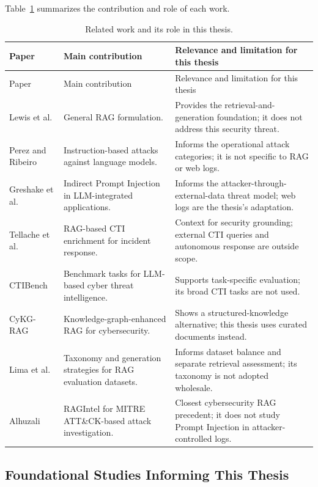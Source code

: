 Table~\ref{tab:related-work-papers} summarizes the contribution and role of
each work.

{\footnotesize
\setlength{\tabcolsep}{3pt}
\begin{longtable}{@{}>{\raggedright\arraybackslash}p{}>{\raggedright\arraybackslash}p{}>{\raggedright\arraybackslash}p{}@{}}
\caption{Related work and its role in this thesis.}
\label{tab:related-work-papers}\\
\toprule
Paper & Main contribution & Relevance and limitation for this thesis \\
\midrule
\endfirsthead
\toprule
Paper & Main contribution & Relevance and limitation for this thesis \\
\midrule
\endhead
\bottomrule
\endlastfoot
Lewis et al. & General RAG formulation. & Provides the retrieval-and-generation foundation; it does not address this security threat. \\
Perez and Ribeiro & Instruction-based attacks against language models. & Informs the operational attack categories; it is not specific to RAG or web logs. \\
Greshake et al. & Indirect Prompt Injection in LLM-integrated applications. & Informs the attacker-through-external-data threat model; web logs are the thesis's adaptation. \\
Tellache et al. & RAG-based CTI enrichment for incident response. & Context for security grounding; external CTI queries and autonomous response are outside scope. \\
CTIBench & Benchmark tasks for LLM-based cyber threat intelligence. & Supports task-specific evaluation; its broad CTI tasks are not used. \\
CyKG-RAG & Knowledge-graph-enhanced RAG for cybersecurity. & Shows a structured-knowledge alternative; this thesis uses curated documents instead. \\
Lima et al. & Taxonomy and generation strategies for RAG evaluation datasets. & Informs dataset balance and separate retrieval assessment; its taxonomy is not adopted wholesale. \\
Alhuzali & RAGIntel for MITRE ATT\&CK-based attack investigation. & Closest cybersecurity RAG precedent; it does not study Prompt Injection in attacker-controlled logs. \\
\end{longtable}
}

\subsection{Foundational Studies Informing This Thesis}
\label{three-foundational-works}


